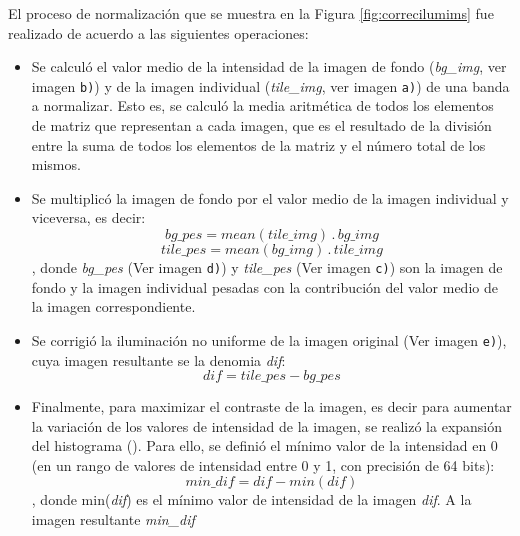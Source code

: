 El proceso de normalización que se muestra en la Figura \ref{fig:correcilumims} fue realizado de acuerdo a las siguientes operaciones:
\begin{itemize}
\justifying
\item Se calculó el valor medio de la intensidad de la imagen de fondo (\textit{bg\_img}, ver imagen \texttt{b)}) y de la imagen individual (\textit{tile\_img}, ver imagen \texttt{a)}) de una banda a normalizar. Esto es, se calculó la media aritmética de todos los elementos de matriz que representan a cada imagen, que es el resultado de la división entre la suma de todos los elementos de la matriz y el número total de los mismos.
\item Se multiplicó la imagen de fondo por el valor medio de la imagen individual y viceversa, es decir:
\begin{equation}
\textit{bg\_pes} = mean(\textit{tile\_img})\hspace{2pt} . \hspace{2pt}\textit{bg\_img}
\end{equation}
\begin{equation}
\textit{tile\_pes} = mean(\textit{bg\_img})\hspace{2pt} . \hspace{2pt}\textit{tile\_img}
\end{equation},
donde \textit{bg\_pes} (Ver imagen \texttt{d)}) y \textit{tile\_pes} (Ver imagen \texttt{c)}) son la imagen de fondo y la imagen individual pesadas con la contribución del valor medio de la imagen correspondiente.
\item Se corrigió la iluminación no uniforme de la imagen original (Ver imagen \texttt{e)}), cuya imagen resultante se la denomia \textit{dif}:
\begin{equation}
\textit{dif} = \textit{tile\_pes} - \textit{bg\_pes}
\end{equation}
\item Finalmente, para maximizar el contraste de la imagen, es decir para aumentar la variación de los valores de intensidad de la imagen, se realizó la expansión del histograma (\cite{anilfund}). Para ello, se definió el mínimo valor de la intensidad en 0 (en un rango de valores de intensidad entre 0 y 1, con precisión de 64 bits):
\begin{equation}
	\textit{min\_dif} = \textit{dif} - min(\textit{dif})
\end{equation},
donde min(\textit{dif}) es el mínimo valor de intensidad de la imagen \textit{dif}. A la imagen resultante \textit{min\_dif}

\end{itemize}






